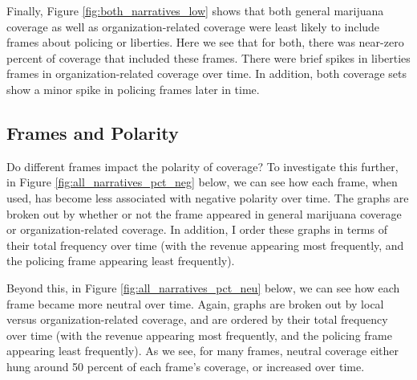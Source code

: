 


Finally, Figure \ref{fig:both_narratives_low} shows that both general marijuana coverage as well as organization-related coverage were least likely to include frames about policing or liberties. Here we see that for both, there was near-zero percent of coverage that included these frames. There were brief spikes in liberties frames in organization-related coverage over time. In addition, both coverage sets show a minor spike in policing frames later in time. 




\subsection{Frames and Polarity}

Do different frames impact the polarity of coverage? To investigate this further, in Figure \ref{fig:all_narratives_pct_neg} below, we can see how each frame, when used, has become less associated with negative polarity over time. The graphs are broken out by whether or not the frame appeared in general marijuana coverage or organization-related coverage. In addition, I order these graphs in terms of their total frequency over time (with the revenue appearing most frequently, and the policing frame appearing least frequently). 

Beyond this, in Figure \ref{fig:all_narratives_pct_neu} below, we can see how each frame became more neutral over time. Again, graphs are broken out by local versus organization-related coverage, and are ordered by their total frequency over time (with the revenue appearing most frequently, and the policing frame appearing least frequently). As we see, for many frames, neutral coverage either hung around 50 percent of each frame's coverage, or increased over time. 







